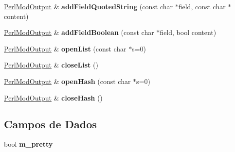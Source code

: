 \begin{DoxyCompactItemize}
\item 
\hypertarget{class_perl_mod_output_a3c050510d02b8b36e20b2fc9ed027087}{\hyperlink{class_perl_mod_output}{Perl\-Mod\-Output} \& {\bfseries add\-Field\-Quoted\-String} (const char $\ast$field, const char $\ast$content)}\label{class_perl_mod_output_a3c050510d02b8b36e20b2fc9ed027087}

\item 
\hypertarget{class_perl_mod_output_a7f4d8de554b97dabdfc9a3293c48400f}{\hyperlink{class_perl_mod_output}{Perl\-Mod\-Output} \& {\bfseries add\-Field\-Boolean} (const char $\ast$field, bool content)}\label{class_perl_mod_output_a7f4d8de554b97dabdfc9a3293c48400f}

\item 
\hypertarget{class_perl_mod_output_aabbadb2add97834cee74fa922a279b7f}{\hyperlink{class_perl_mod_output}{Perl\-Mod\-Output} \& {\bfseries open\-List} (const char $\ast$s=0)}\label{class_perl_mod_output_aabbadb2add97834cee74fa922a279b7f}

\item 
\hypertarget{class_perl_mod_output_aa9c6ca2cea42154eea4e106db5997ca9}{\hyperlink{class_perl_mod_output}{Perl\-Mod\-Output} \& {\bfseries close\-List} ()}\label{class_perl_mod_output_aa9c6ca2cea42154eea4e106db5997ca9}

\item 
\hypertarget{class_perl_mod_output_a1661be902f92f8d7fd9fa98ed021cf17}{\hyperlink{class_perl_mod_output}{Perl\-Mod\-Output} \& {\bfseries open\-Hash} (const char $\ast$s=0)}\label{class_perl_mod_output_a1661be902f92f8d7fd9fa98ed021cf17}

\item 
\hypertarget{class_perl_mod_output_a41807507dbac1960bd198f6a17e3d5ba}{\hyperlink{class_perl_mod_output}{Perl\-Mod\-Output} \& {\bfseries close\-Hash} ()}\label{class_perl_mod_output_a41807507dbac1960bd198f6a17e3d5ba}

\end{DoxyCompactItemize}
\subsection*{Campos de Dados}
\begin{DoxyCompactItemize}
\item 
\hypertarget{class_perl_mod_output_ae6a75e4de7c8355e06035430653e6246}{bool {\bfseries m\-\_\-pretty}}\label{class_perl_mod_output_ae6a75e4de7c8355e06035430653e6246}

\end{DoxyCompactItemize}
